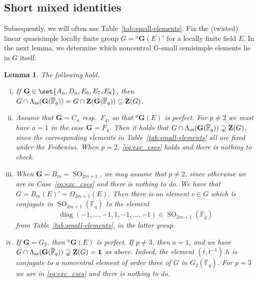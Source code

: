 \documentclass[a4paper,12pt]{amsproc}
\DeclareMathOperator{\SO}{SO}%
\DeclareMathOperator{\diag}{diag}
\theoremstyle{plain}
\newtheorem{lemma}[definition]{Lemma}
\theoremstyle{definition}
\begin{document}
\subsection{Short mixed identities}\label{subsec:shrt_mxd_ids}

Subsequently, we will often use Table~\ref{tab:small-elements}. Fix the (twisted) linear quasisimple locally finite group $G={}^a\mathbf{G}(E)'$ for a locally finite field $E$.
In the next lemma, we determine which noncentral G-small semisimple elements lie in $G$ itself.

\begin{lemma}\label{lem:small_elts_in_fin_grps}
The following hold.
\begin{enumerate}[(i)]
\item If $\mathbf{G}\in\set{A_n,D_n,E_6,E_7,E_8}$, then $G\cap\Lambda_{\rm ss}(\mathbf{G}(\overline{\mathbb{F}}_q))=G\cap\mathbf{Z}(\mathbf{G}(\overline{\mathbb{F}}_q))\subseteq\mathbf{Z}(G)$.
\item Assume that $\mathbf{G}=C_n$ resp.\ $F_4$, so that ${}^a\mathbf{G}(E)$ is perfect. For $p\neq 2$ we must have $a=1$ in the case $\mathbf{G}=F_4$. Then it holds that $G\cap\Lambda_{\rm ss}(\mathbf{G}(\overline{\mathbb{F}}_q))\supsetneq\mathbf{Z}(G)$, since the corresponding elements in Table~\ref{tab:small-elements} all are fixed under the Frobenius. When $p=2$, \eqref{eq:exc_cses} holds and there is nothing to check. 
\item When $\mathbf{G}=B_m=\SO_{2m+1}$, we may assume that $p\neq 2$, since otherwise we are in Case~\eqref{eq:exc_cses} and there is nothing to do. We have that $G=B_m(E)'=\Omega_{2m+1}(E)$.  Then there is an element $c\in G$ which is conjugate in $\SO_{2m+1}(\overline{\mathbb{F}}_q)$ to the element 
$$
\diag(-1,\ldots,-1,1,-1,\ldots,-1)\in\SO_{2m+1}(\overline{\mathbb{F}}_q)
$$ 
from Table~\ref{tab:small-elements}, in the latter group.
\item If $\mathbf{G}=G_2$, then ${}^a\mathbf{G}(E)$ is perfect. If $p\neq 3$, then $a=1$, and we have $G\cap\Lambda_{\rm ss}(\mathbf{G}(\overline{\mathbb{F}}_q))\supsetneq\mathbf{Z}(G)=\mathbf{1}$ as above. Indeed, the element $(t,t^{-1}).h$ is conjugate to a noncentral element of order three of $G$ in $G_2(\overline{\mathbb{F}}_q)$. For $p=3$ we are in \eqref{eq:exc_cses} and there is nothing to do.
\end{enumerate}
\end{lemma}
\end{document}
